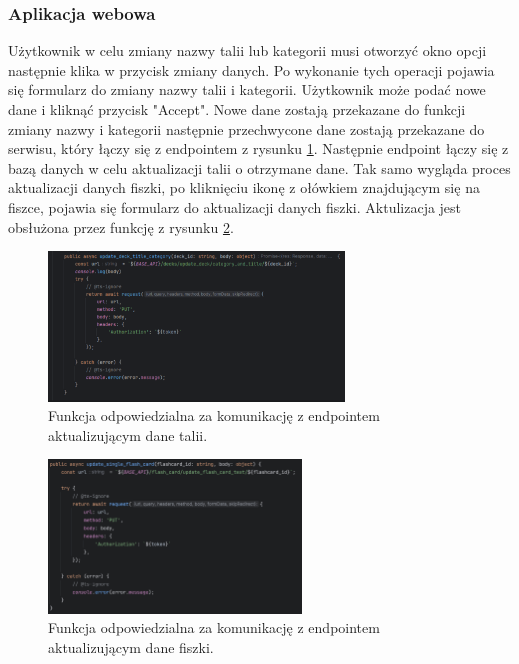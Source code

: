 \subsubsection{Aplikacja webowa}

Użytkownik w celu zmiany nazwy talii lub kategorii musi otworzyć okno opcji następnie klika w przycisk zmiany danych. Po wykonanie tych operacji pojawia się formularz do zmiany nazwy talii i kategorii. Użytkownik może podać nowe dane i kliknąć przycisk "Accept". Nowe dane zostają przekazane do funkcji zmiany nazwy i kategorii następnie przechwycone dane zostają przekazane do serwisu, który łączy się z endpointem z rysunku \ref{img:update_deck_web}. Następnie endpoint łączy się z bazą danych w celu aktualizacji talii o otrzymane dane. Tak samo wygląda proces aktualizacji danych fiszki, po kliknięciu ikonę z ołówkiem znajdującym się na fiszce, pojawia się formularz do aktualizacji danych fiszki. Aktulizacja jest obsłużona przez funkcję z rysunku \ref{img:update_flash_card_web}.

\begin{figure}[H]
    \centering
    \includegraphics[width=0.7\textwidth]{chapters/chapter_8/screens/update_deck_web}
    \caption{Funkcja odpowiedzialna za komunikację z endpointem aktualizującym dane talii.}
    \label{img:update_deck_web}
\end{figure}

\begin{figure}[H]
    \centering
    \includegraphics[width=0.6\textwidth]{chapters/chapter_8/screens/update_flash_card_text_web}
    \caption{Funkcja odpowiedzialna za komunikację z endpointem aktualizującym dane fiszki.}
    \label{img:update_flash_card_web}
\end{figure}

